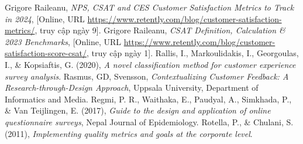 \begin{thebibliography}{9}
     Grigore Raileanu, \textit{NPS, CSAT and CES \- Customer Satisfaction Metrics to Track in 2024}, [Online, URL\: \url{https://www.retently.com/blog/customer-satisfaction-metrics/}, truy cập ngày 9].
     Grigore Raileanu, \textit{CSAT\: Definition, Calculation \& 2023 Benchmarks}, [Online, URL\: \url{https://www.retently.com/blog/customer-satisfaction-score-csat/}, truy cập ngày 1].
     Rallis, I., Markoulidakis, I., Georgoulas, I., \& Kopsiaftis, G. (2020), \textit{A novel classification method for customer experience survey analysis}.
     Rasmus, GD, Svensson, \textit{Contextualizing Customer Feedback: A Research-through-Design Approach}, Uppsala University, Department of Informatics and Media.
     Regmi, P. R., Waithaka, E., Paudyal, A., Simkhada, P., \& Van Teijlingen, E. (2017), \textit{Guide to the design and application of online questionnaire surveys}, Nepal Journal of Epidemiology.
     Rotella, P., \& Chulani, S. (2011), \textit{Implementing quality metrics and goals at the corporate level}.
\end{thebibliography}